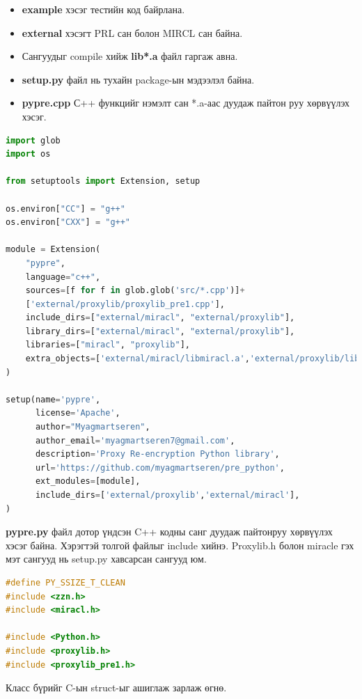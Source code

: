\begin{itemize}
    \item \textbf{example} хэсэг тестийн код байрлана.
    \item \textbf{external} хэсэгт PRL сан болон MIRCL сан байна.
    \item Сангуудыг compile хийж \textbf{lib*.a} файл гаргаж авна.
    \item \textbf{setup.py} файл нь тухайн package-ын мэдээлэл байна.
    \item \textbf{pypre.cpp} С++ функцийг нэмэлт сан *.a-аас дуудаж пайтон руу хөрвүүлэх хэсэг.
\end{itemize}

\begin{lstlisting}[language=Python, caption={setup.py}, captionpos=b]
import glob
import os

from setuptools import Extension, setup

os.environ["CC"] = "g++"
os.environ["CXX"] = "g++"

module = Extension(
    "pypre",
    language="c++",
    sources=[f for f in glob.glob('src/*.cpp')]+
    ['external/proxylib/proxylib_pre1.cpp'],
    include_dirs=["external/miracl", "external/proxylib"],
    library_dirs=["external/miracl", "external/proxylib"],
    libraries=["miracl", "proxylib"],
    extra_objects=['external/miracl/libmiracl.a','external/proxylib/libproxylib.a']
)

setup(name='pypre',
      license='Apache',
      author="Myagmartseren",
      author_email='myagmartseren7@gmail.com',
      description='Proxy Re-encryption Python library',
      url='https://github.com/myagmartseren/pre_python',
      ext_modules=[module],
      include_dirs=['external/proxylib','external/miracl'],
)
\end{lstlisting}

\textbf{pypre.py} файл дотор үндсэн C++ кодны санг дуудаж пайтонруу хөрвүүлэх хэсэг байна.
Хэрэгтэй толгой файлыг include хийнэ. Proxylib.h болон miracle гэх мэт сангууд нь setup.py хавсарсан сангууд юм.

\begin{lstlisting}[language=C, caption={pypre.cpp}, captionpos=b]
#define PY_SSIZE_T_CLEAN
#include <zzn.h>
#include <miracl.h>

#include <Python.h>
#include <proxylib.h>
#include <proxylib_pre1.h>    
\end{lstlisting}

\noindent Класс бүрийг C-ын struct-ыг ашиглаж зарлаж өгнө.


